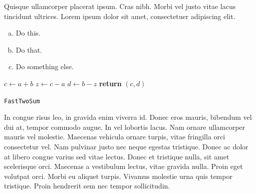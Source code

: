 \documentclass{article}
\begin{document}
\begin{question}
	Quisque ullamcorper placerat ipsum. Cras nibh. Morbi vel justo vitae lacus tincidunt ultrices. Lorem ipsum dolor sit amet, consectetuer adipiscing elit.

	\begin{enumerate}[(a)]
		\item Do this.
		\item Do that.
		\item Do something else.
	\end{enumerate}
\end{question}

\begin{center}
	\begin{minipage}{0.5\linewidth} %
		\begin{algorithm}[H]
			\medskip
			$c \leftarrow a + b$ \;
			$z \leftarrow c - a$ \;
			$d \leftarrow b - z$ \;
			{\bf return} $(c,d)$ \;
			\caption{\texttt{FastTwoSum}} %
			\label{alg:fastTwoSum}   %
		\end{algorithm}
	\end{minipage}
\end{center}

\begin{question}
	In congue risus leo, in gravida enim viverra id. Donec eros mauris, bibendum vel dui at, tempor commodo augue. In vel lobortis lacus. Nam ornare ullamcorper mauris vel molestie. Maecenas vehicula ornare turpis, vitae fringilla orci consectetur vel. Nam pulvinar justo nec neque egestas tristique. Donec ac dolor at libero congue varius sed vitae lectus. Donec et tristique nulla, sit amet scelerisque orci. Maecenas a vestibulum lectus, vitae gravida nulla. Proin eget volutpat orci. Morbi eu aliquet turpis. Vivamus molestie urna quis tempor tristique. Proin hendrerit sem nec tempor sollicitudin.
\end{question}

\end{document}
